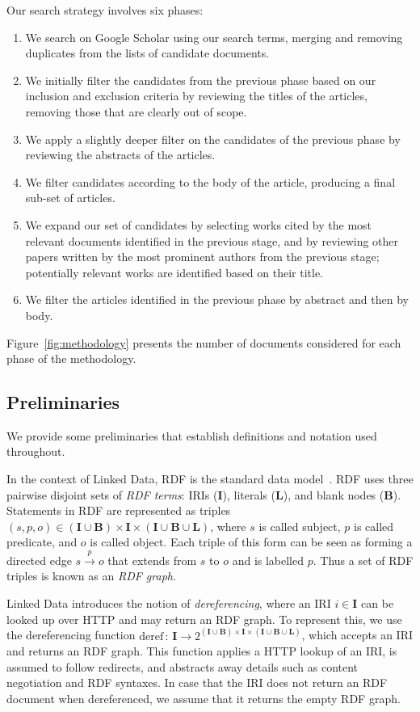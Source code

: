 \documentclass[sw]{iosart2x}
\newcommand{\I}{\ensuremath{\mathbf{I}}}
\newcommand{\B}{\ensuremath{\mathbf{B}}}
\renewcommand{\L}{\ensuremath{\mathbf{L}}}
\newcommand{\deref}[1]{\ensuremath{\mathrm{deref{#1}}}}
\begin{document}
Our search strategy involves six phases:

\begin{enumerate}
\item We search on Google Scholar using our search terms, merging and removing duplicates from the lists of candidate documents.
\item We initially filter the candidates from the previous phase based on our inclusion and exclusion criteria by reviewing the titles of the articles, removing those that are clearly out of scope.
\item We apply a slightly deeper filter on the candidates of the previous phase by reviewing the abstracts of the articles.
\item We filter candidates according to the body of the article, producing a final sub-set of articles.
\item We expand our set of candidates by selecting works cited by the most relevant documents identified in the previous stage, and by reviewing other papers written by the most prominent authors from the previous stage; potentially relevant works are identified based on their title.
\item We filter the articles identified in the previous phase by abstract and then by body.
\end{enumerate}   
Figure~\ref{fig:methodology} presents the number of documents considered for each phase of the methodology.


\subsection{Preliminaries}

We provide some preliminaries that establish definitions and notation used throughout.

In the context of Linked Data, RDF is the standard data model~\cite{rdfconcepts11}. RDF uses three pairwise disjoint sets of \emph{RDF terms}: IRIs (\I), literals (\textbf{L}), and blank nodes (\textbf{B}). Statements in RDF are represented as triples $(s,p,o) \in (\I \cup \B) \times \I \times (\I \cup \B \cup \L)$, where $s$ is called subject, $p$ is called predicate, and $o$ is called object. Each triple of this form can be seen as forming a directed edge $s \xrightarrow{p} o$ that extends from $s$ to $o$ and is labelled $p$. Thus a set of RDF triples is known as an \emph{RDF graph}.

Linked Data introduces the notion of \emph{dereferencing}, where an IRI $i \in \I$ can be looked up over HTTP and may return an RDF graph. To represent this, we use the dereferencing function $\deref\,:\,\I \rightarrow 2^{(\I \cup \B) \times \I \times (\I \cup \B \cup \L)}$, which accepts an IRI and returns an RDF graph. This function applies a HTTP lookup of an IRI, is assumed to follow redirects, and abstracts away details such as content negotiation and RDF syntaxes. In case that the IRI does not return an RDF document when dereferenced, we assume that it returns the empty RDF graph.
\end{document}
